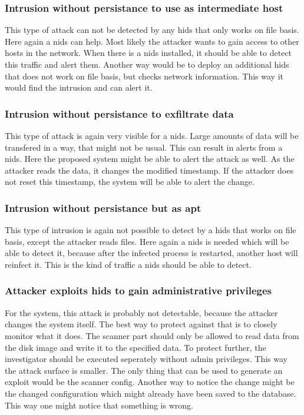 \documentclass[
	a4paper,					%
	10pt,							%
	twoside,					%
	openright,				%
	notitlepage,			%
	parskip=half,			%
]{scrreprt}					%
\begin{document}
\subsubsection{Intrusion without persistance to use as intermediate host}
\label{sec:defense:nopersistanceintermediatehost}

This type of attack can not be detected by any \gls{hids} that only works on file basis. Here again a \gls{nids} can help. Most likely the attacker wants to gain access to other hosts in the network. When there is a \gls{nids} installed, it should be able to detect this traffic and alert them. Another way would be to deploy an additional \gls{hids} that does not work on file basis, but checks network information. This way it would find the intrusion and can alert it.

\subsubsection{Intrusion without persistance to exfiltrate data}
\label{sec:defense:nopersistanceexfiltration}

This type of attack is again very visible for a \gls{nids}. Large amounts of data will be transfered in a way, that might not be usual. This can result in alerts from a \gls{nids}. Here the proposed system might be able to alert the attack as well. As the attacker reads the data, it changes the modified timestamp. If the attacker does not reset this timestamp, the system will be able to alert the change. 

\subsubsection{Intrusion without persistance but as apt}
\label{sec:defense:nopersistanceapt}

This type of intrusion is again not possible to detect by a \gls{hids} that works on file basis, except the attacker reads files. Here again a \gls{nids} is needed which will be able to detect it, because after the infected process is restarted, another host will reinfect it. This is the kind of traffic a \gls{nids} should be able to detect.

\subsubsection{Attacker exploits \gls{hids} to gain administrative privileges}
\label{sec:defense:exploitforroot}

For the system, this attack is probably not detectable, because the attacker changes the system itself. The best way to protect against that is to closely monitor what it does. The scanner part should only be allowed to read data from the disk image and write it to the specified data. To protect further, the investigator should be executed seperately without admin privileges. This way the attack surface is smaller. The only thing that can be used to generate an exploit would be the scanner config. Another way to notice the change might be the changed configuration which might already have been saved to the database. This way one might notice that something is wrong.
\end{document}

